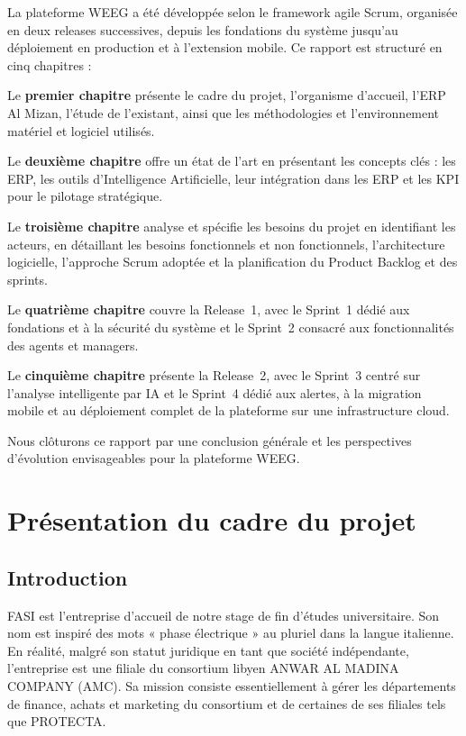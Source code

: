 \documentclass[a4paper,12pt]{report}
\begin{document}
La plateforme WEEG a été développée selon le framework agile Scrum, organisée
en deux releases successives, depuis les fondations du système jusqu'au
déploiement en production et à l'extension mobile. Ce rapport est structuré en
cinq chapitres :

Le \textbf{premier chapitre} présente le cadre du projet, l'organisme d'accueil,
l'ERP Al Mizan, l'étude de l'existant, ainsi que les méthodologies et
l'environnement matériel et logiciel utilisés.

Le \textbf{deuxième chapitre} offre un état de l'art en présentant les concepts
clés : les ERP, les outils d'Intelligence Artificielle, leur intégration dans
les ERP et les KPI pour le pilotage stratégique.

Le \textbf{troisième chapitre} analyse et spécifie les besoins du projet en
identifiant les acteurs, en détaillant les besoins fonctionnels et non
fonctionnels, l'architecture logicielle, l'approche Scrum adoptée et la
planification du Product Backlog et des sprints.

Le \textbf{quatrième chapitre} couvre la Release~1, avec le Sprint~1 dédié aux
fondations et à la sécurité du système et le Sprint~2 consacré aux
fonctionnalités des agents et managers.

Le \textbf{cinquième chapitre} présente la Release~2, avec le Sprint~3 centré
sur l'analyse intelligente par IA et le Sprint~4 dédié aux alertes, à la
migration mobile et au déploiement complet de la plateforme sur une
infrastructure cloud.

Nous clôturons ce rapport par une conclusion générale et les perspectives
d'évolution envisageables pour la plateforme WEEG.
\newpage


\chapter{Présentation du cadre du projet}

\section{Introduction}

FASI est l'entreprise d'accueil de notre stage de fin d'études universitaire.
Son nom est inspiré des mots « phase électrique » au pluriel dans la langue italienne.
En réalité, malgré son statut juridique en tant que société indépendante, l'entreprise est une filiale du consortium libyen ANWAR AL MADINA COMPANY (AMC).
Sa mission consiste essentiellement à gérer les départements de finance, achats et marketing du consortium et de certaines de ses filiales tels que PROTECTA.
\end{document}
